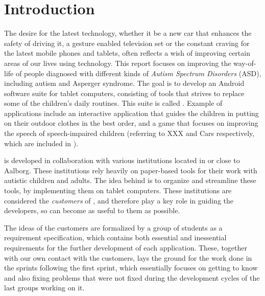 \newcommand{\headerIntroduction}{Introduction}
\chapter*{\headerIntroduction}\label{chap:introduction}
\addcontentsline{toc}{chapter}{\headerIntroduction}

The desire for the latest technology, whether it be a new car that enhances the safety of driving it, a gesture enabled television set or the constant craving for the latest mobile phones and tablets, often reflects a wish of improving certain areas of our lives using technology.
This report focuses on improving the way-of-life of people diagnosed with different kinds of \textit{Autism Spectrum Disorders} (ASD), including autism and Asperger syndrome.
The goal is to develop an Android software suite for tablet computers, consisting of tools that strives to replace some of the children's daily routines. This suite is called \giraf.
Example of \giraf applications include an interactive application that guides the children in putting on their outdoor clothes in the best order, and a game that focuses on improving the speech of speech-impaired children (referring to XXX and Cars respectively, which are included in \giraf).

\giraf is developed in collaboration with various institutions located in or close to Aalborg.
These institutions rely heavily on paper-based tools for their work with autistic children and adults. 
The idea behind \giraf is to organize and streamline these tools, by implementing them on tablet computers.
These institutions are considered the \textit{customers} of \giraf, and therefore play a key role in guiding the developers, so \giraf can become as useful to them as possible.


The ideas of the customers are formalized by a group of students as a requirement specification, which contains both essential and inessential requirements for the further development of each application.
These, together with our own contact with the customers, lays the ground for the work done in the sprints following the first sprint, which essentially focuses on getting to know \giraf and also fixing problems that were not fixed during the development cycles of the last groups working on it.

